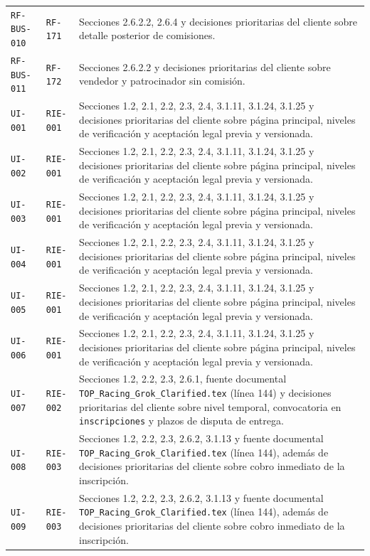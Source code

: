 \documentclass[10pt,letterpaper]{article}
\begin{document}
\begin{landscape}
\begin{longtable}{P{2.7cm}P{2.6cm}P{15.7cm}}
\texttt{RF-BUS-010} & \texttt{RF-171} & Secciones 2.6.2.2, 2.6.4 y decisiones prioritarias del cliente sobre detalle posterior de comisiones.\\
\texttt{RF-BUS-011} & \texttt{RF-172} & Secciones 2.6.2.2 y decisiones prioritarias del cliente sobre vendedor y patrocinador sin comisión.\\
\texttt{UI-001} & \texttt{RIE-001} & Secciones 1.2, 2.1, 2.2, 2.3, 2.4, 3.1.11, 3.1.24, 3.1.25 y decisiones prioritarias del cliente sobre página principal, niveles de verificación y aceptación legal previa y versionada.\\
\texttt{UI-002} & \texttt{RIE-001} & Secciones 1.2, 2.1, 2.2, 2.3, 2.4, 3.1.11, 3.1.24, 3.1.25 y decisiones prioritarias del cliente sobre página principal, niveles de verificación y aceptación legal previa y versionada.\\
\texttt{UI-003} & \texttt{RIE-001} & Secciones 1.2, 2.1, 2.2, 2.3, 2.4, 3.1.11, 3.1.24, 3.1.25 y decisiones prioritarias del cliente sobre página principal, niveles de verificación y aceptación legal previa y versionada.\\
\texttt{UI-004} & \texttt{RIE-001} & Secciones 1.2, 2.1, 2.2, 2.3, 2.4, 3.1.11, 3.1.24, 3.1.25 y decisiones prioritarias del cliente sobre página principal, niveles de verificación y aceptación legal previa y versionada.\\
\texttt{UI-005} & \texttt{RIE-001} & Secciones 1.2, 2.1, 2.2, 2.3, 2.4, 3.1.11, 3.1.24, 3.1.25 y decisiones prioritarias del cliente sobre página principal, niveles de verificación y aceptación legal previa y versionada.\\
\texttt{UI-006} & \texttt{RIE-001} & Secciones 1.2, 2.1, 2.2, 2.3, 2.4, 3.1.11, 3.1.24, 3.1.25 y decisiones prioritarias del cliente sobre página principal, niveles de verificación y aceptación legal previa y versionada.\\
\texttt{UI-007} & \texttt{RIE-002} & Secciones 1.2, 2.2, 2.3, 2.6.1, fuente documental \texttt{TOP\_Racing\_Grok\_Clarified.tex} (línea 144) y decisiones prioritarias del cliente sobre nivel temporal, convocatoria en \texttt{inscripciones} y plazos de disputa de entrega.\\
\texttt{UI-008} & \texttt{RIE-003} & Secciones 1.2, 2.2, 2.3, 2.6.2, 3.1.13 y fuente documental \texttt{TOP\_Racing\_Grok\_Clarified.tex} (línea 144), además de decisiones prioritarias del cliente sobre cobro inmediato de la inscripción.\\
\texttt{UI-009} & \texttt{RIE-003} & Secciones 1.2, 2.2, 2.3, 2.6.2, 3.1.13 y fuente documental \texttt{TOP\_Racing\_Grok\_Clarified.tex} (línea 144), además de decisiones prioritarias del cliente sobre cobro inmediato de la inscripción.\\

\end{longtable}
\end{landscape}
\end{document}
